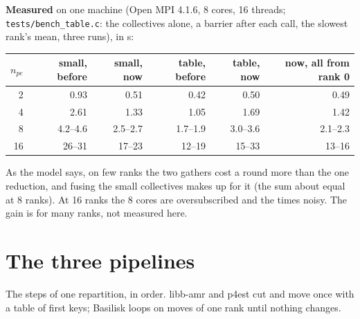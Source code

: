 \documentclass[10pt,a4paper]{article}
\theoremstyle{definition}
\newcommand{\fn}[1]{\texttt{#1}}
\begin{document}
\textbf{Measured} on one machine (Open MPI 4.1.6, 8 cores, 16 threads;
\fn{tests/bench\_table.c}: the collectives alone, a barrier after each
call, the slowest rank's mean, three runs), in \textmu s:

\begin{center}
\small
\begin{tabular}{@{}r r r r r r@{}}
  \toprule
  $n_{pe}$ & small, before & small, now & table, before & table, now &
    now, all from rank 0 \\
  \midrule
  2 & 0.93 & 0.51 & 0.42 & 0.50 & 0.49 \\
  4 & 2.61 & 1.33 & 1.05 & 1.69 & 1.42 \\
  8 & 4.2--4.6 & 2.5--2.7 & 1.7--1.9 & 3.0--3.6 & 2.1--2.3 \\
  16 & 26--31 & 17--23 & 12--19 & 15--33 & 13--16 \\
  \bottomrule
\end{tabular}
\end{center}

As the model says, on few ranks the two gathers cost a round more than
the one reduction, and fusing the small collectives makes up for it (the
sum about equal at 8 ranks). At 16 ranks the 8 cores are oversubscribed
and the times noisy. The gain is for many ranks, not measured here.

\clearpage
\section{The three pipelines}

The steps of one repartition, in order. libb-amr and p4est cut and move
once with a table of first keys; Basilisk loops on moves of one rank until
nothing changes.
\end{document}
